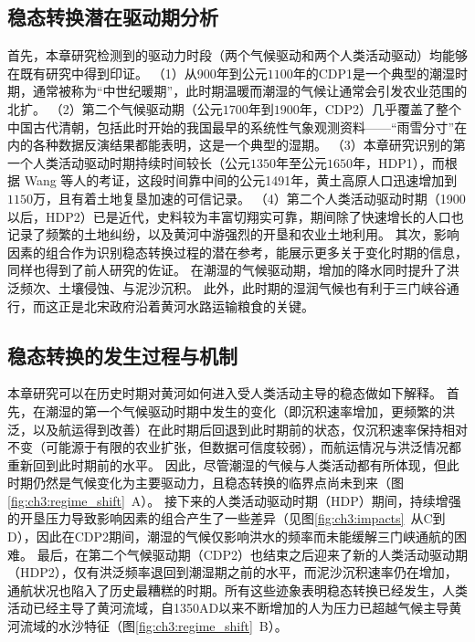 \subsection{稳态转换潜在驱动期分析}

首先，本章研究检测到的驱动力时段（两个气候驱动和两个人类活动驱动）均能够在既有研究中得到印证。
（1）从900年到公元$1100$年的CDP1是一个典型的潮湿时期，通常被称为“中世纪暖期”\cite{zhang1993, zhang1994, man2014}，此时期温暖而潮湿的气候让通常会引发农业范围的北扩\cite{TanQiXiang1996,GeQuanSheng2011}。
（2）第二个气候驱动期（公元$1700$年到$1900$年，CDP2）几乎覆盖了整个中国古代清朝，包括此时开始的我国最早的系统性气象观测资料——“雨雪分寸”在内的各种数据反演结果都能表明，这是一个典型的湿期\cite{hao2021, ge2008}。
（3）本章研究识别的第一个人类活动驱动时期持续时间较长（公元$1350$年至公元$1650$年，HDP1），而根据 Wang 等人的考证，这段时间靠中间的公元1491年，黄土高原人口迅速增加到$1150$万，且有着土地复垦加速的可信记录\cite{wang2006a}。
（4）第二个人类活动驱动时期（1900以后，HDP2）已是近代，史料较为丰富切翔实可靠，期间除了快速增长的人口也记录了频繁的土地纠纷，以及黄河中游强烈的开垦和农业土地利用\cite{GeJianXiong2005}。
其次，影响因素的组合作为识别稳态转换过程的潜在参考，能展示更多关于变化时期的信息，同样也得到了前人研究的佐证。
在潮湿的气候驱动期，增加的降水同时提升了洪泛频次、土壤侵蚀、与泥沙沉积\cite{chen2012}。
此外，此时期的湿润气候也有利于三门峡谷通行，而这正是北宋政府沿着黄河水路运输粮食的关键\cite{WangShouChun1993}。

\subsection{稳态转换的发生过程与机制}

本章研究可以在历史时期对黄河如何进入受人类活动主导的稳态做如下解释。
首先，在潮湿的第一个气候驱动时期中发生的变化（即沉积速率增加，更频繁的洪泛，以及航运得到改善）在此时期后回退到此时期前的状态，仅沉积速率保持相对不变（可能源于有限的农业扩张，但数据可信度较弱），而航运情况与洪泛情况都重新回到此时期前的水平。
因此，尽管潮湿的气候与人类活动都有所体现，但此时期仍然是气候变化为主要驱动力，且稳态转换的临界点尚未到来（图\ref{fig:ch3:regime_shift}~A）。
接下来的人类活动驱动时期（HDP）期间，持续增强的开垦压力导致影响因素的组合产生了一些差异（见图\ref{fig:ch3:impacts}~从C到D），因此在CDP2期间，潮湿的气候仅影响洪水的频率而未能缓解三门峡通航的困难。
最后，在第二个气候驱动期（CDP2）也结束之后迎来了新的人类活动驱动期（HDP2），仅有洪泛频率退回到潮湿期之前的水平，而泥沙沉积速率仍在增加，通航状况也陷入了历史最糟糕的时期。所有这些迹象表明稳态转换已经发生，人类活动已经主导了黄河流域，自1350AD以来不断增加的人为压力已超越气候主导黄河流域的水沙特征（图\ref{fig:ch3:regime_shift}~B）。

